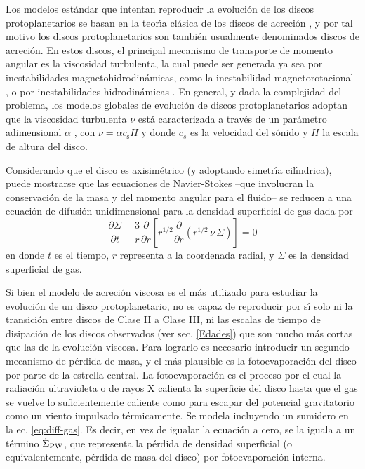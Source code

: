 \documentclass[baaa]{baaa}
\begin{document}
Los modelos est\'andar que intentan reproducir la evoluci\'on de los discos protoplanetarios se basan en la teor\'{\i}a cl\'asica de los discos de acreci\'on \citep[ej.][]{Pringle1981}, y por tal motivo los discos protoplanetarios son tambi\'en usualmente denominados discos de acreci\'on. En estos discos, el principal mecanismo de transporte de momento angular es la viscosidad turbulenta, la cual puede ser generada ya sea por inestabilidades magnetohidrodin\'amicas, como la inestabilidad magnetorotacional \citep[MRI por sus siglas en ingl\'es,][]{Balbus1991}, o por inestabilidades hidrodinámicas \citep[ver por ejemplo el trabajo de][]{Lyra2019}. En general, y dada la complejidad del problema, los modelos globales de evoluci\'on de discos protoplanetarios adoptan que la viscosidad turbulenta $\nu$ est\'a caracterizada a trav\'es de un par\'ametro adimensional $\alpha$ \citep{Shakura1973}, con $\nu= \alpha c_{\text{s}} H$ y donde  $c_s$ es la velocidad del s\'onido y $H$ la escala de altura del disco. 

Considerando que el disco es axisim\'etrico (y adoptando simetr\'{\i}a cil\'{\i}ndrica), puede mostrarse que las ecuaciones de Navier-Stokes --que involucran la conservaci\'on de la masa y del momento angular para el fluido-- se reducen a una ecuaci\'on de difusi\'on unidimensional para la densidad superficial de gas dada por \citep{Pringle1981, Frank1992} 
\begin{equation}
\dfrac{\partial\Sigma}{\partial t}- \dfrac{3}{r}\dfrac{\partial}{\partial r}\left[r^{1/2}\dfrac{\partial}{\partial r}(r^{1/2}\,\nu\,\Sigma)\right] = 0 %
\label{eq:diff-gas}
\end{equation}
en donde $t$ es el tiempo, $r$ representa a la coordenada radial, y $\Sigma$ es la densidad superficial de gas.

Si bien el modelo de acreci\'on viscosa es el m\'as utilizado para estudiar la evoluci\'on de un disco protoplanetario, no es capaz de reproducir por s\'{\i} solo ni la transici\'on entre discos de Clase II a Clase III, ni las escalas de tiempo de disipaci\'on de los discos observados (ver sec. \ref{Edades}) que son mucho m\'as cortas que las de la evoluci\'on viscosa. Para lograrlo es necesario introducir un segundo mecanismo de p\'erdida de masa, y el m\'as plausible es la fotoevaporaci\'on del disco por parte de la estrella central. La fotoevaporaci\'on es el proceso por el cual la radiaci\'on ultravioleta o de rayos X calienta la superficie del disco hasta que el gas se vuelve lo suficientemente caliente como para escapar del potencial gravitatorio como un viento impulsado t\'ermicamente. Se modela incluyendo un sumidero en la ec. \ref{eq:diff-gas}. Es decir, en vez de igualar la ecuaci\'on a cero, se la iguala a un t\'ermino $\dot{\Sigma}_{\rm PW}$, que representa la p\'erdida de densidad superficial (o equivalentemente, p\'erdida de masa del disco) por fotoevaporaci\'on interna.
\end{document}
